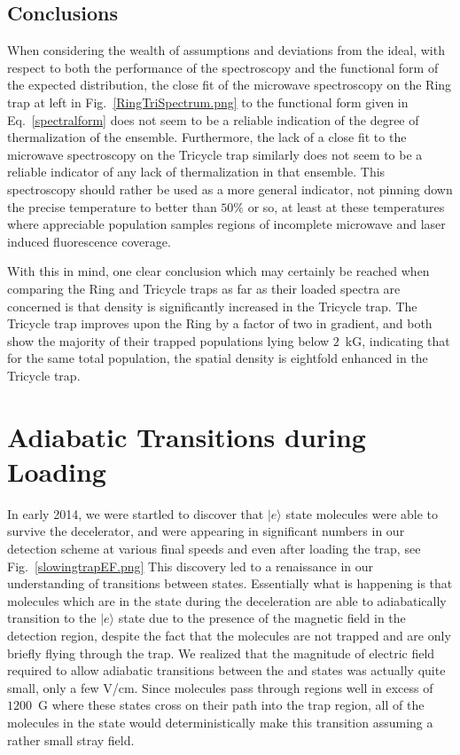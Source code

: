 \documentclass[defaultstyle,11pt]{thesis}
\begin{document}
\subsection{Conclusions}

When considering the wealth of assumptions and deviations from the ideal, with respect to both the performance of the spectroscopy and the functional form of the expected distribution, the close fit of the microwave spectroscopy on the Ring trap at left in Fig.~\ref{RingTriSpectrum.png} to the functional form given in Eq.~\ref{spectralform} does not seem to be a reliable indication of the degree of thermalization of the ensemble.
Furthermore, the lack of a close fit to the microwave spectroscopy on the Tricycle trap similarly does not seem to be a reliable indicator of any lack of thermalization in that ensemble.
This spectroscopy should rather be used as a more general indicator, not pinning down the precise temperature to better than $50\%$ or so, at least at these temperatures where appreciable population samples regions of incomplete microwave and laser induced fluorescence coverage.

With this in mind, one clear conclusion which may certainly be reached when comparing the Ring and Tricycle traps as far as their loaded spectra are concerned is that density is significantly increased in the Tricycle trap.
The Tricycle trap improves upon the Ring by a factor of two in gradient, and both show the majority of their trapped populations lying below $2$~kG, indicating that for the same total population, the spatial density is eightfold enhanced in the Tricycle trap.

\section{Adiabatic Transitions during Loading}
\label{loadingtransitions}

In early 2014, we were startled to discover that $|e\rangle$ state molecules were able to survive the decelerator, and were appearing in significant numbers in our detection scheme at various final speeds and even after loading the trap, see Fig.~\ref{slowingtrapEF.png}
This discovery led to a renaissance in our understanding of transitions between states.
Essentially what is happening is that molecules which are in the  state during the deceleration are able to adiabatically transition to the $|e\rangle$ state due to the presence of the magnetic field in the detection region, despite the fact that the molecules are not trapped and are only briefly flying through the trap.
We realized that the magnitude of electric field required to allow adiabatic transitions between the  and  states was actually quite small, only a few V/cm.
Since molecules pass through regions well in excess of $1200$~G where these states cross on their path into the trap region, all of the molecules in the  state would deterministically make this transition assuming a rather small stray field.
\end{document}
